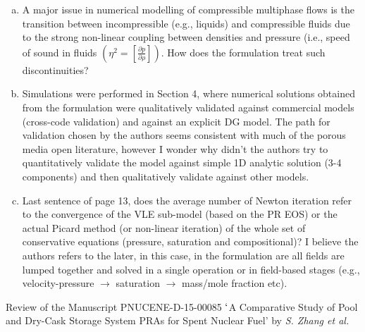 \documentclass[14pt,twoside]{report}
\begin{document}
{{\begin{enumerate}[(a)]
%
\item A major issue in numerical modelling of compressible multiphase flows is the transition between incompressible (e.g., liquids) and compressible fluids due to the strong non-linear coupling between densities and pressure (i.e., speed of sound in fluids $\left(\eta^{2}=\left[\frac{\partial p}{\partial \rho}\right]\right)$. How does the formulation treat such discontinuities?
%
\item Simulations were performed in Section 4, where numerical solutions obtained from the formulation were qualitatively validated against commercial models (cross-code validation) and against an explicit DG model. The path for validation chosen by the authors seems consistent with much of the porous media open literature, however I wonder why didn't the authors try to quantitatively validate the model against simple 1D analytic solution (3-4 components) and then qualitatively validate against other models.
%
\item Last sentence of page 13, does the average number of Newton iteration refer to the convergence of the VLE sub-model (based on the PR EOS) or the actual Picard method (or non-linear iteration) of the whole set of conservative equations (pressure, saturation and compositional)? I believe the authors refers to the later, in this case, in the formulation are all fields are lumped together and solved in a single operation or in field-based stages (e.g., velocity-pressure $\rightarrow$ saturation $\rightarrow$ mass/mole fraction etc).
%
\end{enumerate}

{
  
}


\afterpage{%
    \clearpage%
    \thispagestyle{empty}%
    \begin{landscape}%
        \centering %
        \vfill
    \end{landscape}
    \clearpage%
}
\vfill
\clearpage



\begin{center}
{\Large Review of the Manuscript PNUCENE-D-15-00085 $\lq$A Comparative Study of Pool and Dry-Cask Storage System PRAs for Spent Nuclear Fuel' by {\it S. Zhang et al.}}
\end{center}

}}
\end{document}
